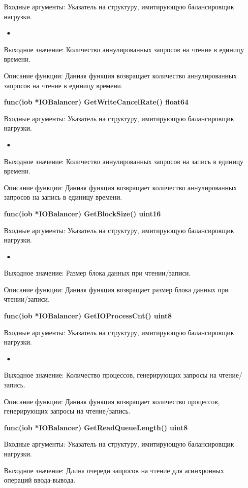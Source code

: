 Входные аргументы: Указатель на структуру, имитирующую балансировщик нагрузки.
\begin{itemize}
	\item 
\end{itemize}
Выходное значение: Количество аннулированных запросов на чтение в единицу времени.

Описание функции: Данная функция возвращает количество аннулированных запросов на чтение в единицу времени.

\textbf{func(iob *IOBalancer) GetWriteCancelRate() float64}

Входные аргументы: Указатель на структуру, имитирующую балансировщик нагрузки.
\begin{itemize}
	\item 
\end{itemize}
Выходное значение: Количество аннулированных запросов на запись в единицу времени. 

Описание функции: Данная функция возвращает количество аннулированных запросов на запись в единицу времени.

\textbf{func(iob *IOBalancer) GetBlockSize() uint16}

Входные аргументы: Указатель на структуру, имитирующую балансировщик нагрузки.
\begin{itemize}
	\item 
\end{itemize}
Выходное значение:  Размер блока данных при чтении/записи.

Описание функции: Данная функция возвращает  размер блока данных при чтении/записи.

\textbf{func(iob *IOBalancer) GetIOProcessCnt() uint8}

Входные аргументы: Указатель на структуру, имитирующую балансировщик нагрузки.
\begin{itemize}
	\item 
\end{itemize}
Выходное значение: Количество процессов, генерирующих запросы на чтение/запись.

Описание функции: Данная функция возвращает количество процессов, генерирующих запросы на чтение/запись.

\textbf{func(iob *IOBalancer) GetReadQueueLength() uint8}

Входные аргументы: Указатель на структуру, имитирующую балансировщик нагрузки.

Выходное значение: Длина очереди запросов на чтение для асинхронных операций ввода-вывода.

